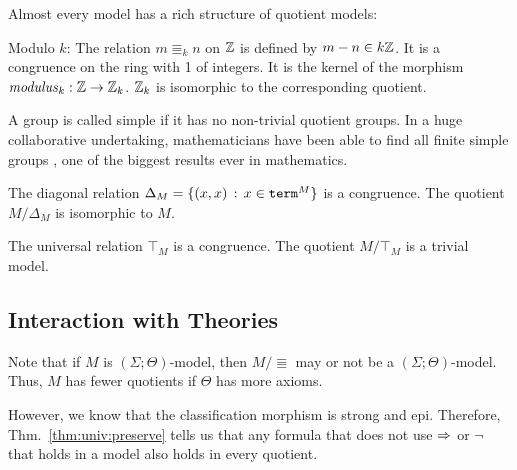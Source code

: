 \begin{example}
Almost every model has a rich structure of quotient models:
\begin{compactitem}
\item Modulo $k$: The relation $m\Equiv_k n$ on $\mathbb{Z}$ is defined by $m-n\in k\mathbb{Z}$. It is a congruence on the ring with 1 of integers.
It is the kernel of the morphism $\mathit{modulus}_k:\mathbb{Z}\to\mathbb{Z}_k$.
$\mathbb{Z}_k$ is isomorphic to the corresponding quotient.
\item A group is called simple if it has no non-trivial quotient groups. In a huge collaborative undertaking, mathematicians have been able to find all finite simple groups \cite{finitegroups1}, one of the biggest results ever in mathematics.
\item The diagonal relation $\Delta_M=\{(x,x)\,:\,x\in \mathtt{term}^M\}$ is a congruence.
The quotient $M/\Delta_M$ is isomorphic to $M$.
\item The universal relation $\top_M$ is a congruence.
The quotient $M/\top_M$ is a trivial model.
\end{compactitem}
\end{example}


\subsection{Interaction with Theories}

Note that if $M$ is $(\Sigma;\Theta)$-model, then $M/\Equiv$ may or not be a $(\Sigma;\Theta)$-model.
Thus, $M$ has fewer quotients if $\Theta$ has more axioms.

However, we know that the classification morphism is strong and epi.
Therefore, Thm.~\ref{thm:univ:preserve} tells us that any formula that does not use $\Rightarrow$ or $\neg$ that holds in a model also holds in every quotient.

%

